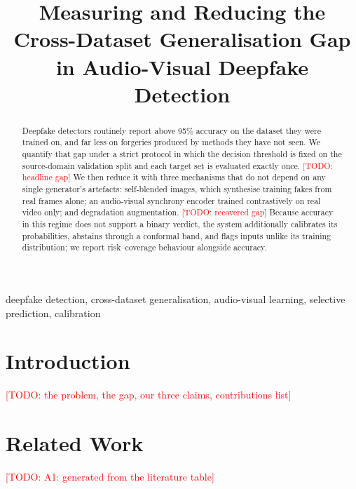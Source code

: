 \documentclass[conference]{IEEEtran}
\newcommand{\todo}[1]{\textcolor{red}{[TODO: #1]}}
\begin{document}
\title{Measuring and Reducing the Cross-Dataset Generalisation Gap\\
in Audio-Visual Deepfake Detection}

\author{
}

\maketitle

\begin{abstract}
Deepfake detectors routinely report above 95\% accuracy on the dataset they
were trained on, and far less on forgeries produced by methods they have not
seen. We quantify that gap under a strict protocol in which the decision
threshold is fixed on the source-domain validation split and each target set is
evaluated exactly once. \todo{headline gap} We then reduce it with three
mechanisms that do not depend on any single generator's artefacts: self-blended
images, which synthesise training fakes from real frames alone; an
audio-visual synchrony encoder trained contrastively on real video only; and
degradation augmentation. \todo{recovered gap} Because accuracy in this regime
does not support a binary verdict, the system additionally calibrates its
probabilities, abstains through a conformal band, and flags inputs unlike its
training distribution; we report risk--coverage behaviour alongside accuracy.
\end{abstract}

\begin{IEEEkeywords}
deepfake detection, cross-dataset generalisation, audio-visual learning,
selective prediction, calibration
\end{IEEEkeywords}

\section{Introduction}
\todo{the problem, the gap, our three claims, contributions list}

\section{Related Work}
\todo{A1: generated from the literature table}
\end{document}
